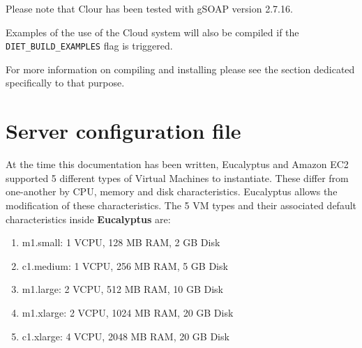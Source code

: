 Please note that \diet Clour has been tested with gSOAP version 2.7.16.

Examples of the use of the \diet Cloud system will also be compiled if the \verb!DIET_BUILD_EXAMPLES! flag
is triggered.

For more information on compiling and installing \diet please see the section dedicated specifically to that purpose.


\section{Server configuration file}

At the time this documentation has been written, Eucalyptus and Amazon
EC2 supported 5 different types of Virtual Machines to
instantiate. These differ from one-another by CPU, memory and disk
characteristics. Eucalyptus allows the modification of these
characteristics. The 5 VM types and their associated default
characteristics inside \textbf{Eucalyptus} are:
\begin{enumerate}
\item{m1.small}: 1 VCPU, 128 MB RAM, 2 GB Disk
\item{c1.medium}: 1 VCPU, 256 MB RAM, 5 GB Disk 
\item{m1.large}: 2 VCPU, 512 MB RAM, 10 GB Disk 
\item{m1.xlarge}: 2 VCPU, 1024 MB RAM, 20 GB Disk 
\item{c1.xlarge}: 4 VCPU, 2048 MB RAM, 20 GB Disk 
\end{enumerate}

